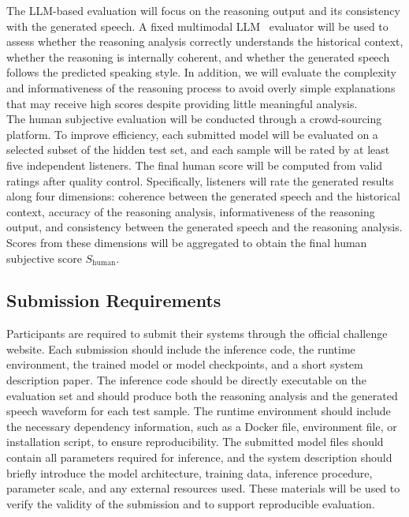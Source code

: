 \documentclass[a4paper]{article}
\begin{document}
\noindent The LLM-based evaluation will focus on the reasoning output and its consistency with the generated speech. A fixed multimodal LLM~\cite{qwen3technicalreport} evaluator will be used to assess whether the reasoning analysis correctly understands the historical context, whether the reasoning is internally coherent, and whether the generated speech follows the predicted speaking style. In addition, we will evaluate the complexity and informativeness of the reasoning process to avoid overly simple explanations that may receive high scores despite providing little meaningful analysis.\\

\noindent The human subjective evaluation will be conducted through a crowd-sourcing platform. To improve efficiency, each submitted model will be evaluated on a selected subset of the hidden test set, and each sample will be rated by at least five independent listeners. The final human score will be computed from valid ratings after quality control. Specifically, listeners will rate the generated results along four dimensions: coherence between the generated speech and the historical context, accuracy of the reasoning analysis, informativeness of the reasoning output, and consistency between the generated speech and the reasoning analysis. Scores from these dimensions will be aggregated to obtain the final human subjective score $S_{\mathrm{human}}$.\\


\subsection{Submission Requirements}

Participants are required to submit their systems through the official challenge website. Each submission should include the inference code, the runtime environment, the trained model or model checkpoints, and a short system description paper. The inference code should be directly executable on the evaluation set and should produce both the reasoning analysis and the generated speech waveform for each test sample. The runtime environment should include the necessary dependency information, such as a Docker file, environment file, or installation script, to ensure reproducibility. The submitted model files should contain all parameters required for inference, and the system description should briefly introduce the model architecture, training data, inference procedure, parameter scale, and any external resources used. These materials will be used to verify the validity of the submission and to support reproducible evaluation.
\end{document}
